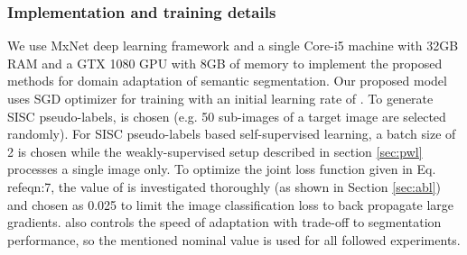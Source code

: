 \documentclass[10pt,twocolumn,letterpaper]{article}
\begin{document}
\subsubsection{Implementation and training details}
\vspace{-0.1cm}

We use MxNet \cite{mxnet15} deep learning framework and a single Core-i5 machine with 32GB RAM and a GTX 1080 GPU with 8GB of memory to implement the proposed methods for domain adaptation of semantic segmentation. Our proposed model uses SGD optimizer for training with an initial learning rate of . To generate SISC pseudo-labels,  is chosen (e.g. 50 sub-images of a target image are selected randomly).
For SISC pseudo-labels based self-supervised learning, a batch size of 2 is chosen while the weakly-supervised setup described in section \ref{sec:pwl} processes a single image only. To optimize the joint loss function given in Eq. ref{eqn:7}, the value of  is investigated thoroughly (as shown in Section \ref{sec:abl}) and chosen as 0.025 to limit the image classification loss to back propagate large gradients.  also controls the speed of adaptation with trade-off to segmentation performance, so the mentioned nominal value is used for all followed experiments. 
\end{document}
